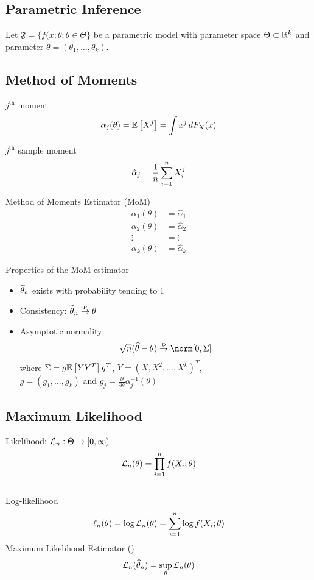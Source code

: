 \documentclass[landscape]{article}
\newenvironment{titemize}[1]{
  \begin{minipage}[h]{\columnwidth}
    #1
    \begin{itemize}
}{
    \end{itemize}
  \end{minipage}
}
\begin{document}
\begin{multicols*}{2}
\section{Parametric Inference}

Let $\mathfrak{F} = \bigl\{ f(x;\theta : \theta \in \Theta \bigr\}$ be a
parametric model with parameter space $\Theta \subset \mathbb{R}^k$ and parameter 
$\theta = (\theta_1,\dots,\theta_k)$.

\subsection{Method of Moments}

$j^{\mathrm{th}}$ moment
$$\alpha_j(\theta) = \mathbb{E}_{}\left[X^j\right] = \displaystyle\int x^j \,dF_X(x)$$

$j^{\mathrm{th}}$ sample moment
$$\hat{\alpha}_j = \displaystyle\frac{1}{n}\sum_{i=1}^n X_i^j$$

Method of Moments Estimator (MoM)
\begin{align*}
  \alpha_1(\theta) &= \hat{\alpha}_1 \\
  \alpha_2(\theta) &= \hat{\alpha}_2 \\
  \vdots &= \vdots \\
  \alpha_k(\theta) &= \hat{\alpha}_k
\end{align*}

\begin{titemize}{Properties of the MoM estimator}
  \item $\widehat{\theta}_n$ exists with probability tending to 1
  \item Consistency: $\widehat{\theta}_n \stackrel{\text{\tiny{P}}}{\rightarrow} \theta$
  \item Asymptotic normality:
    $$\sqrt{n}(\that-\theta) \dconv \norm[0,\Sigma]$$
    where $\Sigma = g\mathbb{E}_{}\left[YY^T\right]g^T$, $Y = (X,X^2,\dots,X^k)^T$,\\
    $g = (g_1,\dots,g_k)$ and 
    $g_j = \frac{\partial}{\partial\theta}\alpha_j^{-1}(\theta)$
\end{titemize}

\subsection{Maximum Likelihood}

Likelihood: $\mathcal{L}_n : \Theta \to [0,\infty)$
  $$\mathcal{L}_n(\theta) = \displaystyle\prod_{i=1}^n f(X_i;\theta)$$ \\
Log-likelihood 
  $$\ell_n(\theta) = \log \mathcal{L}_n(\theta) = \sum_{i=1}^n \log f(X_i;\theta)$$
Maximum Likelihood Estimator (\mle) 
$$\mathcal{L}_n(\widehat{\theta}_n) = \sup_\theta \mathcal{L}_n(\theta)$$


\end{multicols*}
\end{document}
